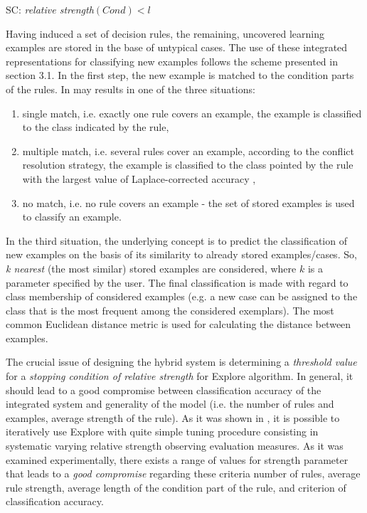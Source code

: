 \documentclass{article}
\begin{document}
\begin{center}
SC: {\em relative strength}$(Cond) < l$
\end{center}

Having induced a set of decision rules, the remaining, uncovered learning
examples are stored in the base of untypical cases. The use of these
integrated representations for classifying new examples follows the scheme
presented in section 3.1. In the first step, the new example is matched to
the condition parts of the rules. In may results in one of the three
situations:

\begin{enumerate}
\item  single match, i.e. exactly one rule covers an example, the example is
classified to the class indicated by the rule,

\item  multiple match, i.e. several rules cover an example, according to the
conflict resolution strategy, the example is classified to the
class pointed by the rule with the largest value of
Laplace-corrected accuracy \cite{Wilk},

\item  no match, i.e. no rule covers an example - the set of stored examples
is used to classify an example.
\end{enumerate}

In the third situation, the underlying concept is to predict the
classification of new examples on the basis of its similarity to
already stored examples/cases. So, {\em k nearest} (the most
similar) stored examples are considered, where $k$ is a parameter
specified by the user. The final classification is made with
regard to class membership of considered examples (e.g. a new case
can be assigned to the class that is the most frequent among the
considered exemplars). The most common Euclidean distance metric
is used for calculating the distance between examples.

The crucial issue of designing the hybrid system is determining a {\em %
threshold value} for a {\em stopping condition of relative strength} for
Explore algorithm. In general, it should lead to a good compromise between
classification accuracy of the integrated system and generality of the model
(i.e. the number of rules and examples, average strength of the rule). As it
was shown in \cite{ii}, it is possible to iteratively use Explore with quite
simple tuning procedure consisting in systematic varying relative strength
observing evaluation measures. As it was examined experimentally, there
exists a range of values for strength parameter that leads to a {\em good
compromise} regarding these criteria number of rules, average rule strength,
average length of the condition part of the rule, and criterion of
classification accuracy.
\end{document}
